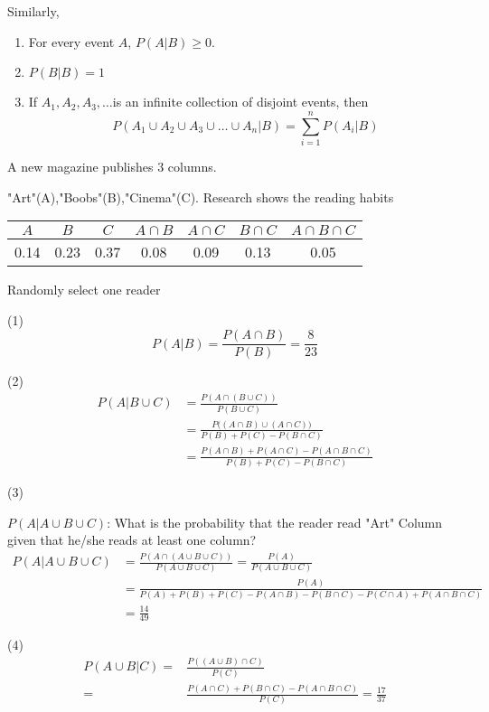 Similarly,
\begin{enumerate}
\item  For every event $A$, $P(A|B)\geq 0$.
\item  $P(B|B)=1$
\item  If $A_1, A_2,A_3,\dots$is an infinite collection of disjoint events, then 
\[  P(A_1 \cup A_2\cup A_3 \cup \dots\cup A_n|B)=\sum_{i=1}^{n}P(A_i|B) \]
\end{enumerate}

\begin{exmp}
A new magazine publishes 3 columns.

"Art"(A),"Boobs"(B),"Cinema"(C).
Research shows the reading habits

\begin{center}
\begin{tabular}{ccccccc}
\hline
$A$ & $B$ & $C$ & $A\cap B$ & $A\cap C$ & $B\cap C$ & $A \cap B\cap C$\\
\hline
0.14&0.23&0.37&0.08&0.09&0.13&0.05\\
\hline
\end{tabular}
\end{center}

Randomly select one reader

(1)
\[P(A|B)=\frac{P(A \cap B)}{P(B)}=\boxed{\frac{8}{23}}\]

(2)
\begin{align*}
P(A|B\cup C)&=\frac{P(A\cap (B\cup C) )}{P(B\cup C)}\\
&=\frac{P\big( (A\cap B)\cup(A \cap C) \big)}{P(B)+P(C)-P(B \cap C)}\\
&=\frac{P(A\cap B)+P(A\cap C)-P(A\cap B\cap C)}{P(B)+P(C)-P(B \cap C)}
\end{align*}

(3)

$P(A|A \cup B \cup C)$: What is the probability that the reader read "Art" Column given that  he/she reads at least one column?
\begin{align*}
P(A|A \cup B \cup C)&=\frac{P(A \cap (A \cup B \cup C) )}{P(A \cup B \cup C)}=\frac{P(A)}{P(A \cup B \cup C)}\\
&=\frac{P(A)}{P(A)+P(B)+P(C)-P(A \cap B)-P(B \cap C)-P(C \cap A)+P(A \cap B \cap C)}\\
&=\boxed{\frac{14}{49}}
\end{align*}

(4)
\begin{align*}
P(A \cup B |C)=&\frac{P((A \cup B)\cap C)}{P(C)}\\
=&\frac{P(A \cap C) +P(B \cap C)-P(A \cap B \cap C)}{P(C)}=\boxed{\frac{17}{37}}
\end{align*}
\end{exmp}

